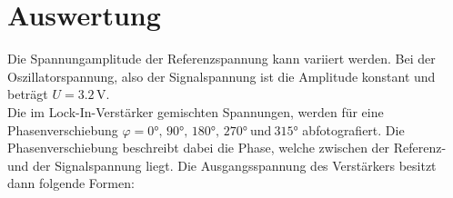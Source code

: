 


\section{Auswertung}
\label{sec:Auswertung}

Die Spannungamplitude der Referenzspannung kann variiert werden. Bei der Oszillatorspannung, also der Signalspannung 
ist die Amplitude konstant und beträgt $U=3.2 \, \unit{\volt}$.\\
Die im Lock-In-Verstärker gemischten Spannungen, werden für eine Phasenverschiebung 
$\varphi= 0°,\, 90°,\, 180°,\, 270° \ \text{und} \ 315°$ abfotografiert. Die Phasenverschiebung beschreibt dabei die 
Phase, welche zwischen der Referenz- und der Signalspannung liegt. Die Ausgangsspannung des Verstärkers besitzt dann 
folgende Formen:

